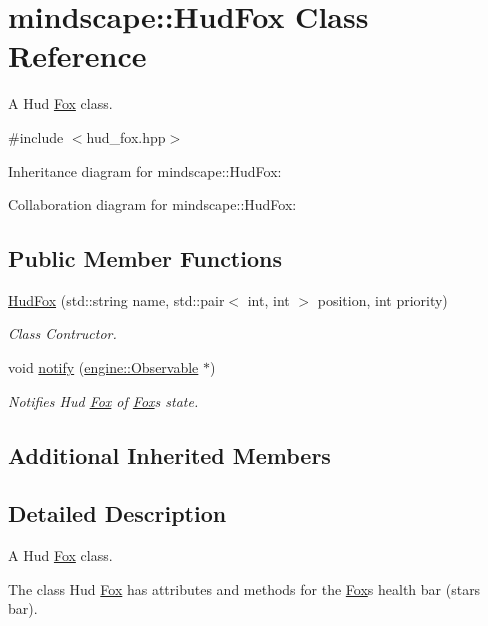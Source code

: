 \hypertarget{classmindscape_1_1_hud_fox}{}\section{mindscape\+:\+:Hud\+Fox Class Reference}
\label{classmindscape_1_1_hud_fox}


A Hud \hyperlink{classmindscape_1_1_fox}{Fox} class.  




{\ttfamily \#include $<$hud\+\_\+fox.\+hpp$>$}



Inheritance diagram for mindscape\+:\+:Hud\+Fox\+:


Collaboration diagram for mindscape\+:\+:Hud\+Fox\+:
\subsection*{Public Member Functions}
\begin{DoxyCompactItemize}
\item 
\hyperlink{classmindscape_1_1_hud_fox_affa10d22e2ffd68fb505630ff7f0bd5f}{Hud\+Fox} (std\+::string name, std\+::pair$<$ int, int $>$ position, int priority)
\begin{DoxyCompactList}\small\item\em Class Contructor. \end{DoxyCompactList}\item 
void \hyperlink{classmindscape_1_1_hud_fox_af2076f6d6287cbab6305f09432512e93}{notify} (\hyperlink{classengine_1_1_observable}{engine\+::\+Observable} $\ast$)
\begin{DoxyCompactList}\small\item\em Notifies Hud \hyperlink{classmindscape_1_1_fox}{Fox} of \hyperlink{classmindscape_1_1_fox}{Fox}\textquotesingle{}s state. \end{DoxyCompactList}\end{DoxyCompactItemize}
\subsection*{Additional Inherited Members}


\subsection{Detailed Description}
A Hud \hyperlink{classmindscape_1_1_fox}{Fox} class. 

The class Hud \hyperlink{classmindscape_1_1_fox}{Fox} has attributes and methods for the \hyperlink{classmindscape_1_1_fox}{Fox}\textquotesingle{}s health bar (stars bar). 

